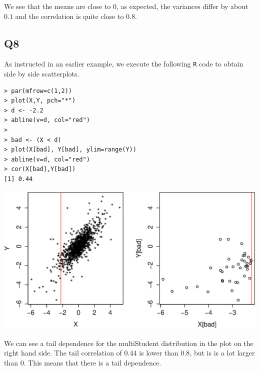 We see that the means are close to $0$, as expected, the variances differ by about $0.1$ and the correlation is quite close to $0.8$.

\subsection*{Q8}

As instructed in an earlier example, we execute the following \verb|R| code to obtain side by side scatterplots.

\begin{verbatim}
> par(mfrow=c(1,2))
> plot(X,Y, pch="*")
> d <- -2.2
> abline(v=d, col="red")
> 
> bad <- (X < d)
> plot(X[bad], Y[bad], ylim=range(Y))
> abline(v=d, col="red")
> cor(X[bad],Y[bad])
[1] 0.44
\end{verbatim}

\includegraphics[scale=.6]{NL1_Q9_scatterplot.eps} 

We can see a tail dependence for the multiStudent distribution in the plot on the right hand side. The tail correlation of $0.44$ is lower than $0.8$, but is is a lot larger than $0$. This means that there is a tail dependence.
